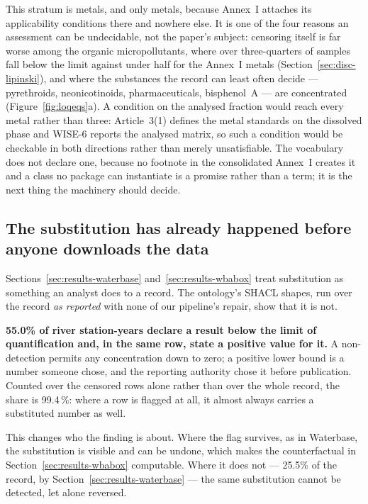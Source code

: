 This stratum is metals, and only metals, because Annex~I attaches its
applicability conditions there and nowhere else. It is one of the four reasons an
assessment can be undecidable, not the paper's subject: censoring itself is far
worse among the organic micropollutants, where over three-quarters of samples
fall below the limit against under half for the Annex~I metals
(Section~\ref{sec:disc-lipinski}), and where the substances the record can least
often decide --- pyrethroids, neonicotinoids, pharmaceuticals, bisphenol~A ---
are concentrated (Figure~\ref{fig:loqeqs}a). A condition on the analysed
fraction would reach every metal rather than three: Article~3(1) defines the
metal standards on the dissolved phase and WISE-6 reports the analysed matrix,
so such a condition would be checkable in both directions rather than merely
unsatisfiable. The vocabulary does not declare one, because no footnote in the
consolidated Annex~I creates it and a class no package can instantiate is a
promise rather than a term; it is the next thing the machinery should decide.

\subsection{The substitution has already happened before anyone downloads
the data}
\label{sec:results-asreported}
Sections~\ref{sec:results-waterbase} and~\ref{sec:results-wbabox} treat
substitution as something an analyst does to a record. The ontology's SHACL
shapes, run over the record \emph{as reported} with none of our pipeline's
repair, show that it is not.

\textbf{\num{55.0}\% of river station-years declare a result below the limit of
quantification and, in the same row, state a positive value for it.} A
non-detection permits any concentration down to zero; a positive lower bound is
a number someone chose, and the reporting authority chose it before
publication. Counted over the censored rows alone rather than over the whole
record, the share is \num{99.4}\,\%: where a row is flagged at all, it almost
always carries a substituted number as well.

This changes who the finding is about. Where the flag survives, as in
Waterbase, the substitution is visible and can be undone, which makes the
counterfactual in Section~\ref{sec:results-wbabox} computable. Where it does
not --- \num{25.5}\% of the record, by Section~\ref{sec:results-waterbase} ---
the same substitution cannot be detected, let alone reversed.

